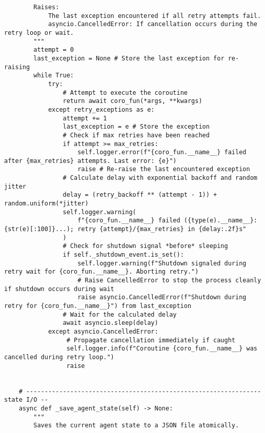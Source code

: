 \documentclass[12pt,a4paper]{article}
\begin{document}
\begin{pageablecode}
\begin{verbatim}
        Raises:
            The last exception encountered if all retry attempts fail.
            asyncio.CancelledError: If cancellation occurs during the retry loop or wait.
        """
        attempt = 0
        last_exception = None # Store the last exception for re-raising
        while True:
            try:
                # Attempt to execute the coroutine
                return await coro_fun(*args, **kwargs)
            except retry_exceptions as e:
                attempt += 1
                last_exception = e # Store the exception
                # Check if max retries have been reached
                if attempt >= max_retries:
                    self.logger.error(f"{coro_fun.__name__} failed after {max_retries} attempts. Last error: {e}")
                    raise # Re-raise the last encountered exception
                # Calculate delay with exponential backoff and random jitter
                delay = (retry_backoff ** (attempt - 1)) + random.uniform(*jitter)
                self.logger.warning(
                    f"{coro_fun.__name__} failed ({type(e).__name__}: {str(e)[:100]}...); retry {attempt}/{max_retries} in {delay:.2f}s"
                )
                # Check for shutdown signal *before* sleeping
                if self._shutdown_event.is_set():
                    self.logger.warning(f"Shutdown signaled during retry wait for {coro_fun.__name__}. Aborting retry.")
                    # Raise CancelledError to stop the process cleanly if shutdown occurs during wait
                    raise asyncio.CancelledError(f"Shutdown during retry for {coro_fun.__name__}") from last_exception
                # Wait for the calculated delay
                await asyncio.sleep(delay)
            except asyncio.CancelledError:
                 # Propagate cancellation immediately if caught
                 self.logger.info(f"Coroutine {coro_fun.__name__} was cancelled during retry loop.")
                 raise


    # ---------------------------------------------------------------- state I/O --
    async def _save_agent_state(self) -> None:
        """
        Saves the current agent state to a JSON file atomically.


\end{verbatim}
\end{pageablecode}
\end{document}

